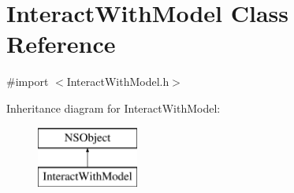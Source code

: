 \section{Interact\+With\+Model Class Reference}
\label{interface_interact_with_model}


{\ttfamily \#import $<$Interact\+With\+Model.\+h$>$}

Inheritance diagram for Interact\+With\+Model\+:\begin{figure}[H]
\begin{center}
\leavevmode
\includegraphics[height=2.000000cm]{interface_interact_with_model}
\end{center}
\end{figure}
